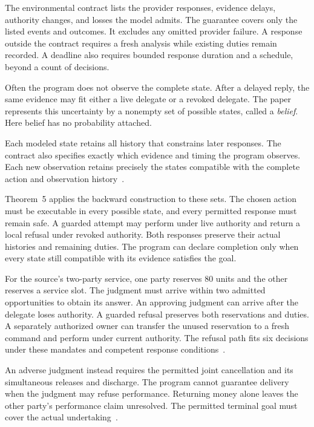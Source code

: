 \documentclass{momentum}
\begin{document}
The environmental contract lists the provider responses, evidence delays, authority changes, and losses the model admits.
The guarantee covers only the listed events and outcomes. It excludes any omitted provider failure.
A response outside the contract requires a fresh analysis while existing duties remain recorded.
A deadline also requires bounded response duration and a schedule, beyond a count of decisions.

Often the program does not observe the complete state.
After a delayed reply, the same evidence may fit either a live delegate or a revoked delegate.
The paper represents this uncertainty by a nonempty set of possible states, called a \emph{belief}.
Here belief has no probability attached.

Each modeled state retains all history that constrains later responses.
The contract also specifies exactly which evidence and timing the program observes.
Each new observation retains precisely the states compatible with the complete action and observation history~\cite[Section~7.8]{institutions}.

Theorem~5 applies the backward construction to these sets.
The chosen action must be executable in every possible state, and every permitted response must remain safe.
A guarded attempt may perform under live authority and return a local refusal under revoked authority.
Both responses preserve their actual histories and remaining duties.
The program can declare completion only when every state still compatible with its evidence satisfies the goal.

For the source's two-party service, one party reserves 80 units and the other reserves a service slot.
The judgment must arrive within two admitted opportunities to obtain its answer.
An approving judgment can arrive after the delegate loses authority.
A guarded refusal preserves both reservations and duties.
A separately authorized owner can transfer the unused reservation to a fresh command and perform under current authority.
The refusal path fits six decisions under these mandates and competent response conditions~\cite[Section~7.8, Example~1]{institutions}.

An adverse judgment instead requires the permitted joint cancellation and its simultaneous releases and discharge.
The program cannot guarantee delivery when the judgment may refuse performance.
Returning money alone leaves the other party's performance claim unresolved.
The permitted terminal goal must cover the actual undertaking~\cite[Section~7.8, Example~1]{institutions}.
\end{document}
